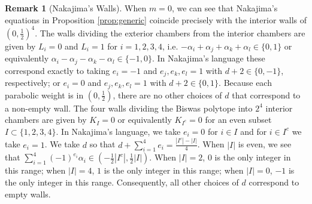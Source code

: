 \documentclass[12pt,letterpaper,reqno]{amsart}
\def\mathbf#1{#1}%
\theoremstyle{remark}
\theoremstyle{definition}
\newtheorem{rem}[thm]{Remark}
\numberwithin{thm}{section}
\numberwithin{equation}{section}
\numberwithin{figure}{section}
\begin{document}
  
 \begin{rem}[Nakajima's Walls]
 When $\mathbf{m}=0$, we can see that Nakajima's equations in Proposition \ref{prop:generic} coincide precisely with the interior walls of $(0, \frac{1}{2})^4$.
  The walls dividing the exterior chambers from the interior chambers  are given by $L_i=0$ and $L_i=1$ for $i=1, 2, 3, 4$, i.e. $-\alpha_i + \alpha_j + \alpha_k + \alpha_l \in \{0, 1\}$ or equivalently $\alpha_i -\alpha_j - \alpha_k - \alpha_l \in \{-1, 0\}$. In Nakajima's language these correspond exactly to taking  $e_i=-1$ and $e_j, e_k, e_l=1$ with $d+ 2 \in \{0, -1\}$, respectively; or $e_i=0$ and $e_j, e_k, e_l=1$ with $d+ 2 \in \{0, 1\}$. Because each parabolic weight is in $(0, \frac{1}{2})$, there are no other choices of $d$ that correspond to a non-empty wall. The four walls dividing the Biswas polytope into $2^4$ interior chambers are given by $K_I=0$ or equivalently $K_{I^c}=0$ for
 an even subset $I \subset \{1, 2, 3, 4\}$. In Nakajima's language, we take $e_i=0$ for $i \in I$ and for $i \in I^c$ we take $e_i=1$. We take $d$ so that $d + \sum_{i=1}^4 e_i = \frac{|I^c| -|I|}{4}$. 
 When $|I|$ is even, we see that $\sum_{i=1}^4(-1)^{e_i} \alpha_i \in (-\frac{1}{2}|I^c|, \frac{1}{2} |I|)$. When $|I|=2$, $0$ is the only integer in this range; when $|I|=4$, $1$ is the only integer in this range; when $|I|=0$, $-1$ is the only integer in this range. Consequently, all other choices of $d$ correspond to empty walls.
\end{rem} 
\end{document}
